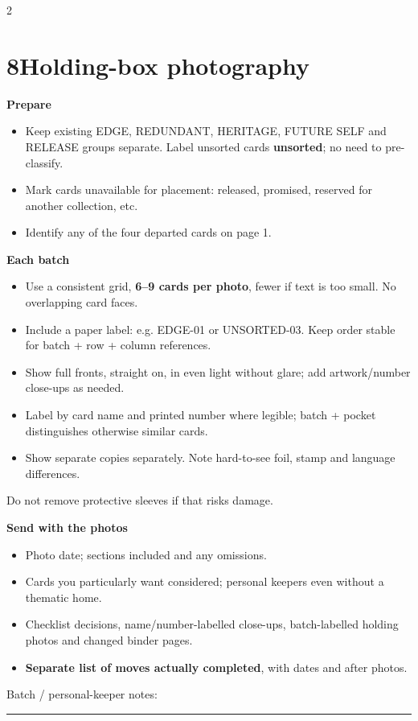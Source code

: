 \documentclass[10pt,a4paper]{article}
\newcommand{\sub}[1]{\par\vspace{3pt}\textbf{#1}\par}
\newcommand{\blank}{\rule{\linewidth}{0.25pt}}
\newcommand{\smallnote}[1]{{\fontsize{8.5}{10}\selectfont #1\par}}
\begin{document}
\begin{multicols}{2}
\section{8\quad Holding-box photography}
\sub{Prepare}
\begin{itemize}
\item Keep existing EDGE, REDUNDANT, HERITAGE, FUTURE SELF and RELEASE groups separate. Label unsorted cards \textbf{unsorted}; no need to pre-classify.
\item Mark cards unavailable for placement: released, promised, reserved for another collection, etc.
\item Identify any of the four departed cards on page 1.
\end{itemize}
\sub{Each batch}
\begin{itemize}
\item Use a consistent grid, \textbf{6--9 cards per photo}, fewer if text is too small. No overlapping card faces.
\item Include a paper label: e.g. EDGE-01 or UNSORTED-03. Keep order stable for batch + row + column references.
\item Show full fronts, straight on, in even light without glare; add artwork/number close-ups as needed.
\item Label by card name and printed number where legible; batch + pocket distinguishes otherwise similar cards.
\item Show separate copies separately. Note hard-to-see foil, stamp and language differences.
\end{itemize}
\smallnote{Do not remove protective sleeves if that risks damage.}
\sub{Send with the photos}
\begin{itemize}
\item Photo date; sections included and any omissions.
\item Cards you particularly want considered; personal keepers even without a thematic home.
\item Checklist decisions, name/number-labelled close-ups, batch-labelled holding photos and changed binder pages.
\item \textbf{Separate list of moves actually completed}, with dates and after photos.
\end{itemize}
Batch / personal-keeper notes: \hrulefill\par\blank
\end{multicols}
\end{document}
